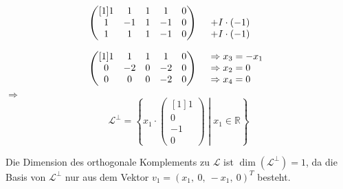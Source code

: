 \documentclass[main.tex]{subfiles}
\begin{document}
\begin{equation*}
    \begin{array}{ r l }
    \begin{pmatrix}[1]
    1 & 1 & 1 & 1 & 0\\
    1 & -1 & 1 & -1 & 0\\
    1 & 1 & 1 & -1 & 0
    \end{pmatrix} & \begin{array}{ l }
    \\
    +I\cdotp ( -1)\\
    +I\cdotp ( -1)
    \end{array}\vspace*{4mm}\\
    \begin{pmatrix}[1]
    1 & 1 & 1 & 1 & 0\\
    0 & -2 & 0 & -2 & 0\\
    0 & 0 & 0 & -2 & 0
    \end{pmatrix} & \begin{array}{ l }
    \Rightarrow x_{3} =-x_{1}\\
    \Rightarrow x_{2} =0\\
    \Rightarrow x_{4} =0
    \end{array}
    \end{array}
\end{equation*}
$\Rightarrow $
\begin{equation*}
    \mathcal{L}^{\perp } =\left\{x_{1} \cdotp \begin{pmatrix}[1]
    1\\
    0\\
    -1\\
    0
    \end{pmatrix}\middle| x_{1} \in \mathbb{R}\right\}
\end{equation*}

Die Dimension des orthogonale Komplements zu $\mathcal{L}$ ist $\dim\left( \mathcal{L}^{\perp }\right) =1$, da die Basis von $\mathcal{L}^{\perp }$ nur aus dem Vektor $v_{1} =( x_{1} ,\ 0,\ -x_{1} ,\ 0)^{T}$ besteht.
\end{document}
